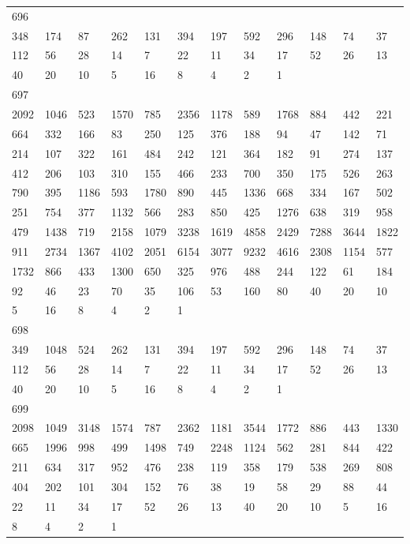 \begin{longtable}{llllllllllll}
696&&&&&&&&&&&\\
348& 174& 87& 262& 131& 394& 197& 592& 296& 148& 74& 37\\
112& 56& 28& 14& 7& 22& 11& 34& 17& 52& 26& 13\\
40& 20& 10& 5& 16& 8& 4& 2& 1& \\

697&&&&&&&&&&&\\
2092& 1046& 523& 1570& 785& 2356& 1178& 589& 1768& 884& 442& 221\\
664& 332& 166& 83& 250& 125& 376& 188& 94& 47& 142& 71\\
214& 107& 322& 161& 484& 242& 121& 364& 182& 91& 274& 137\\
412& 206& 103& 310& 155& 466& 233& 700& 350& 175& 526& 263\\
790& 395& 1186& 593& 1780& 890& 445& 1336& 668& 334& 167& 502\\
251& 754& 377& 1132& 566& 283& 850& 425& 1276& 638& 319& 958\\
479& 1438& 719& 2158& 1079& 3238& 1619& 4858& 2429& 7288& 3644& 1822\\
911& 2734& 1367& 4102& 2051& 6154& 3077& 9232& 4616& 2308& 1154& 577\\
1732& 866& 433& 1300& 650& 325& 976& 488& 244& 122& 61& 184\\
92& 46& 23& 70& 35& 106& 53& 160& 80& 40& 20& 10\\
5& 16& 8& 4& 2& 1& \\

698&&&&&&&&&&&\\
349& 1048& 524& 262& 131& 394& 197& 592& 296& 148& 74& 37\\
112& 56& 28& 14& 7& 22& 11& 34& 17& 52& 26& 13\\
40& 20& 10& 5& 16& 8& 4& 2& 1& \\

699&&&&&&&&&&&\\
2098& 1049& 3148& 1574& 787& 2362& 1181& 3544& 1772& 886& 443& 1330\\
665& 1996& 998& 499& 1498& 749& 2248& 1124& 562& 281& 844& 422\\
211& 634& 317& 952& 476& 238& 119& 358& 179& 538& 269& 808\\
404& 202& 101& 304& 152& 76& 38& 19& 58& 29& 88& 44\\
22& 11& 34& 17& 52& 26& 13& 40& 20& 10& 5& 16\\
8& 4& 2& 1& \\


\end{longtable}
